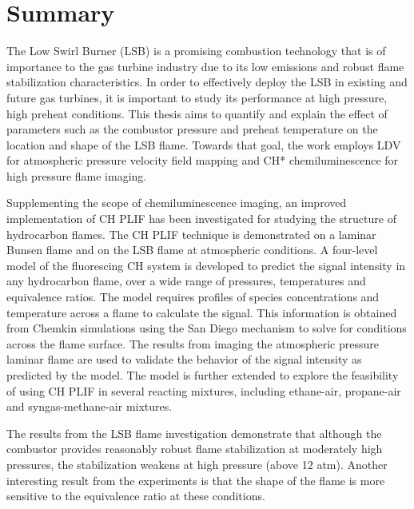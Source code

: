 \chapter*{Summary}

The Low Swirl Burner (LSB) is a promising combustion technology that is of importance to the gas turbine industry due to its low  emissions and robust flame stabilization characteristics.
In order to effectively deploy the LSB in existing and future gas turbines, it is important to study its performance at high pressure, high preheat conditions.
This thesis aims to quantify and explain the effect of parameters such as the combustor pressure and preheat temperature on the location and shape of the LSB flame.
Towards that goal, the work employs LDV for atmospheric pressure velocity field mapping and CH* chemiluminescence for high pressure flame imaging.

Supplementing the scope of chemiluminescence imaging, an improved implementation of CH PLIF has been investigated for studying the structure of hydrocarbon flames.
The CH PLIF technique is demonstrated on a laminar Bunsen flame and on the LSB flame at atmospheric conditions.
A four-level model of the fluorescing CH system is developed to predict the signal intensity in any hydrocarbon flame, over a wide range of pressures, temperatures and equivalence ratios.
The model requires profiles of species concentrations and temperature across a flame to calculate the signal.
This information is obtained from Chemkin simulations using the San Diego mechanism to solve for conditions across the flame surface.
The results from imaging the atmospheric pressure laminar flame are used to validate the behavior of the signal intensity as predicted by the model.
The model is further extended to explore the feasibility of using CH PLIF in several reacting mixtures, including ethane-air, propane-air and syngas-methane-air mixtures.

The results from the LSB flame investigation demonstrate that although the combustor provides reasonably robust flame stabilization at moderately high pressures, the stabilization weakens at high pressure (above 12 atm).
Another interesting result from the experiments is that the shape of the flame is more sensitive to the equivalence ratio at these conditions.

